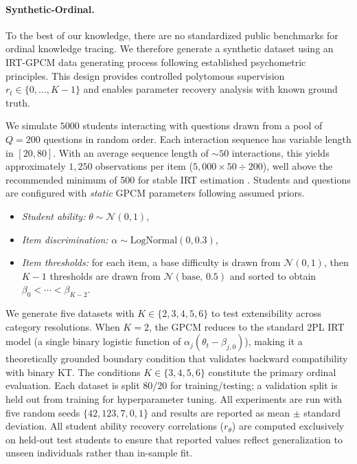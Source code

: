 \documentclass[pdflatex,sn-apa]{sn-jnl}
\begin{document}
\paragraph{Synthetic-Ordinal.}
To the best of our knowledge, there are no standardized public benchmarks for ordinal knowledge tracing. We therefore generate a synthetic dataset using an IRT-GPCM data generating process following established psychometric principles. This design provides controlled polytomous supervision $r_t\in\{0,\ldots,K-1\}$ and enables parameter recovery analysis with known ground truth.

We simulate $5000$ students interacting with questions drawn from a pool of $Q=200$ questions in random order. Each interaction sequence has variable length in $[20,80]$. With an average sequence length of $\sim\!50$ interactions, this yields approximately $1{,}250$ observations per item ($5{,}000 \times 50 \div 200$), well above the recommended minimum of 500 for stable IRT estimation \citep{de_ayala_theory_2009}. Students and questions are configured with \emph{static} GPCM parameters following assumed priors.
\begin{itemize}
    \item \textit{Student ability:} $\theta\sim\mathcal{N}(0,1)$,
    \item \textit{Item discrimination:} $\alpha\sim \mathrm{LogNormal}(0,0.3)$,
    \item \textit{Item thresholds:} for each item, a base difficulty is drawn from $\mathcal{N}(0,1)$, then $K{-}1$ thresholds are drawn from $\mathcal{N}(\mathrm{base},\,0.5)$ and sorted to obtain $\beta_0<\cdots<\beta_{K-2}$.
\end{itemize}
We generate five datasets with $K\in\{2,3,4,5,6\}$ to test extensibility across category resolutions. When $K=2$, the GPCM reduces to the standard 2PL IRT model (a single binary logistic function of $\alpha_j(\theta_t - \beta_{j,0})$), making it a theoretically grounded boundary condition that validates backward compatibility with binary KT. The conditions $K\in\{3,4,5,6\}$ constitute the primary ordinal evaluation. Each dataset is split 80/20 for training/testing; a validation split is held out from training for hyperparameter tuning. All experiments are run with five random seeds $\{42, 123, 7, 0, 1\}$ and results are reported as mean $\pm$ standard deviation. All student ability recovery correlations ($r_\theta$) are computed exclusively on held-out test students to ensure that reported values reflect generalization to unseen individuals rather than in-sample fit.
\end{document}
